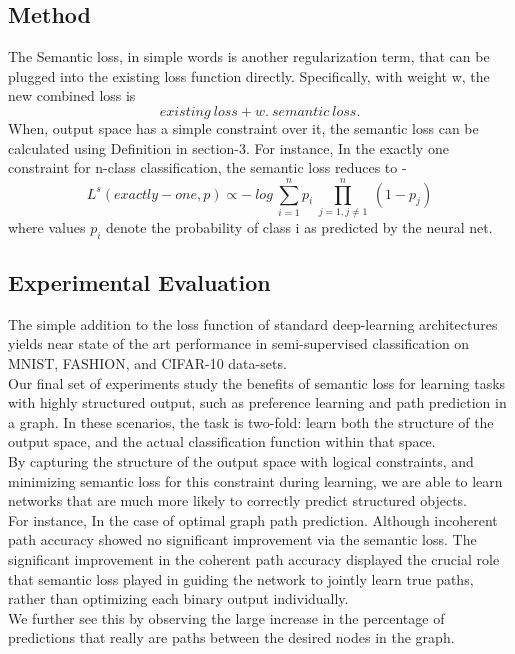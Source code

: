 \documentclass[12pt]{article}
\begin{document}
\subsection{Method}
The Semantic loss, in simple words is another regularization term, that can be plugged into the existing loss function directly. Specifically, with weight w, the new combined loss is 
\begin{displaymath}
existing\ loss + w.\ semantic\ loss.
\end{displaymath}
When, output space has a simple constraint over it, the semantic loss can be calculated using Definition in section-3. For instance, In the exactly one constraint for n-class classification, the semantic loss reduces to - 
\begin{displaymath}
L^s(exactly-one,p) \propto -\ log \ \sum_{i=1}^{n} p_i\ \prod_{j=1, j\neq1}^{n} \ (1-p_j)
\end{displaymath}
where values $p_i$ denote the probability of class i as predicted by the neural net.
\subsection{Experimental Evaluation}
The simple addition to the loss function of standard deep-learning architectures yields near state of the art performance in semi-supervised classification on MNIST, FASHION, and CIFAR-10 data-sets.\\
Our final set of experiments study the benefits of semantic loss for learning tasks with highly structured output, such as preference learning and path prediction in a graph. In these scenarios, the task is two-fold: learn both the structure of the output space, and the actual classification function within that space.\\ 
By capturing the structure of the output space with logical constraints, and minimizing semantic loss for this constraint during learning, we are able to learn networks that are much more likely to correctly predict structured objects.\\
For instance, In the case of optimal graph path prediction. Although incoherent path accuracy showed no significant improvement via the semantic loss. The significant improvement in the coherent path accuracy displayed the crucial role that semantic loss played in guiding the network to jointly learn true paths, rather than optimizing each binary output individually.\\
We further see this by observing the large increase in the percentage of predictions that really are paths between the desired nodes in the graph.
\end{document}
